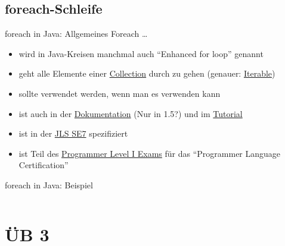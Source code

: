 \documentclass[usepdftitle=false,hyperref={pdfpagelabels=false}]{beamer}
\begin{document}
\subsection{foreach-Schleife}
\begin{frame}{foreach in Java: Allgemeines}
    Foreach \dots
    \begin{itemize}[<+->]
        \item wird in Java-Kreisen manchmal auch "`Enhanced for loop"' genannt
        \item geht alle Elemente einer 
              \href{http://docs.oracle.com/javase/7/docs/api/java/util/Collection.html}{Collection} 
              durch zu gehen (genauer: \href{http://docs.oracle.com/javase/7/docs/api/java/lang/Iterable.html}{Iterable})
        \item sollte verwendet werden, wenn man es verwenden kann
        \item ist auch in der \href{http://docs.oracle.com/javase/1.5.0/docs/guide/language/foreach.html}{Dokumentation} (Nur in 1.5?)
              und im \href{http://docs.oracle.com/javase/tutorial/java/nutsandbolts/for.html}{Tutorial}
        \item ist in der \href{http://docs.oracle.com/javase/specs/jls/se7/html/jls-14.html\#jls-14.14.2}{JLS SE7} spezifiziert
        \item ist Teil des \href{http://docs.oracle.com/javase/tutorial/extra/certification/javase-7-programmer1.html}{Programmer Level I Exams} 
              für das "`Programmer Language Certification"'
    \end{itemize}
\end{frame}
\begin{frame}{foreach in Java: Beispiel}
    \inputminted[linenos=false, numbersep=5pt, tabsize=4, fontsize=\small, firstline=3, lastline=13]{java}{foreach.java}
\end{frame}

\section{ÜB 3}
\end{document}
